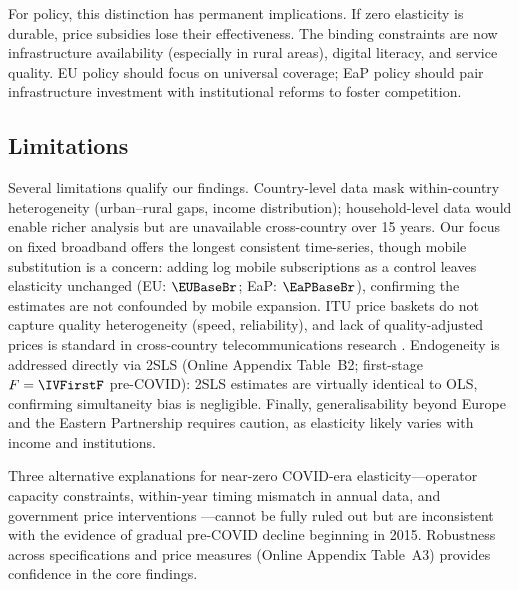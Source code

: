 For policy, this distinction has permanent implications. If zero elasticity is durable,
price subsidies lose their effectiveness. The binding
constraints are now infrastructure availability (especially in rural areas),
digital literacy, and service quality. EU policy should focus
on universal coverage; EaP policy should pair infrastructure investment with
institutional reforms to foster competition.

\subsection{Limitations}

Several limitations qualify our findings. Country-level data mask within-country heterogeneity (urban--rural gaps, income distribution); household-level data would enable richer analysis but are unavailable cross-country over 15 years. Our focus on fixed broadband offers the longest consistent time-series, though mobile substitution is a concern: adding log mobile subscriptions as a control leaves elasticity unchanged (EU: $\EUBaseBr$; EaP: $\EaPBaseBr$), confirming the estimates are not confounded by mobile expansion. ITU price baskets do not capture quality heterogeneity (speed, reliability), and lack of quality-adjusted prices is standard in cross-country telecommunications research \citep{greenstein2016measuring}. Endogeneity is addressed directly via 2SLS (Online Appendix Table~B2; first-stage $F = \IVFirstF$ pre-COVID): 2SLS estimates are virtually identical to OLS, confirming simultaneity bias is negligible. Finally, generalisability beyond Europe and the Eastern Partnership requires caution, as elasticity likely varies with income and institutions.

Three alternative explanations for near-zero COVID-era elasticity---operator capacity constraints, within-year timing mismatch in annual data, and government price interventions \citep{oecd2021broadband}---cannot be fully ruled out but are inconsistent with the evidence of gradual pre-COVID decline beginning in 2015. Robustness across specifications and price measures (Online Appendix Table~A3) provides confidence in the core findings.
